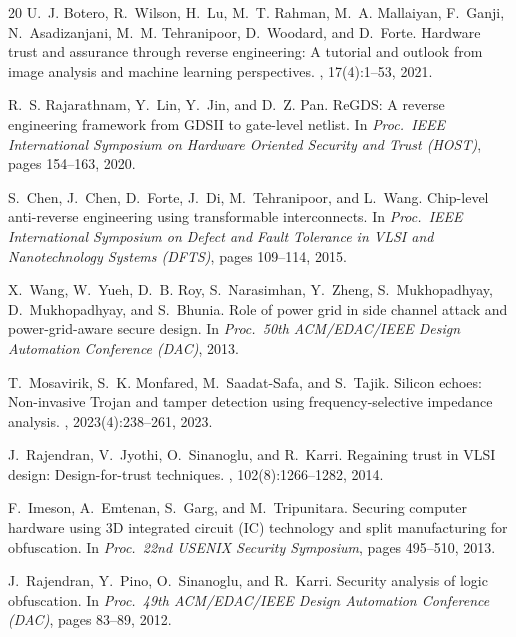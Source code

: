 \documentclass[11pt]{article}
\begin{document}
\begin{thebibliography}{20}
U.~J. Botero, R.~Wilson, H.~Lu, M.~T. Rahman, M.~A. Mallaiyan, F.~Ganji,
  N.~Asadizanjani, M.~M. Tehranipoor, D.~Woodard, and D.~Forte.
\newblock Hardware trust and assurance through reverse engineering: A
  tutorial and outlook from image analysis and machine learning
  perspectives.
,
  17(4):1--53, 2021.

R.~S. Rajarathnam, Y.~Lin, Y.~Jin, and D.~Z. Pan.
\newblock ReGDS: A reverse engineering framework from GDSII to gate-level
  netlist.
\newblock In {\em Proc.\ IEEE International Symposium on Hardware Oriented
  Security and Trust (HOST)}, pages 154--163, 2020.

S.~Chen, J.~Chen, D.~Forte, J.~Di, M.~Tehranipoor, and L.~Wang.
\newblock Chip-level anti-reverse engineering using transformable
  interconnects.
\newblock In {\em Proc.\ IEEE International Symposium on Defect and Fault
  Tolerance in VLSI and Nanotechnology Systems (DFTS)}, pages 109--114,
  2015.

X.~Wang, W.~Yueh, D.~B. Roy, S.~Narasimhan, Y.~Zheng, S.~Mukhopadhyay,
  D.~Mukhopadhyay, and S.~Bhunia.
\newblock Role of power grid in side channel attack and power-grid-aware
  secure design.
\newblock In {\em Proc.\ 50th ACM/EDAC/IEEE Design Automation Conference
  (DAC)}, 2013.

T.~Mosavirik, S.~K. Monfared, M.~Saadat-Safa, and S.~Tajik.
\newblock Silicon echoes: Non-invasive Trojan and tamper detection using
  frequency-selective impedance analysis.
, 2023(4):238--261, 2023.

J.~Rajendran, V.~Jyothi, O.~Sinanoglu, and R.~Karri.
\newblock Regaining trust in VLSI design: Design-for-trust techniques.
, 102(8):1266--1282, 2014.

F.~Imeson, A.~Emtenan, S.~Garg, and M.~Tripunitara.
\newblock Securing computer hardware using 3D integrated circuit (IC)
  technology and split manufacturing for obfuscation.
\newblock In {\em Proc.\ 22nd USENIX Security Symposium}, pages 495--510,
  2013.

J.~Rajendran, Y.~Pino, O.~Sinanoglu, and R.~Karri.
\newblock Security analysis of logic obfuscation.
\newblock In {\em Proc.\ 49th ACM/EDAC/IEEE Design Automation Conference
  (DAC)}, pages 83--89, 2012.


\end{thebibliography}
\end{document}
